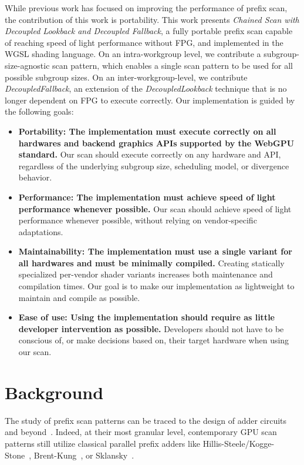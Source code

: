 \documentclass[sigconf]{acmart}
\begin{document}
While previous work has focused on improving the performance of prefix scan, the contribution of this work is portability. This work presents \emph{Chained Scan with Decoupled Lookback and Decoupled Fallback}, a fully portable prefix scan capable of reaching speed of light performance without FPG, and implemented in the WGSL shading language. On an intra-workgroup level, we contribute a subgroup-size-agnostic scan pattern, which enables a single scan pattern to be used for all possible subgroup sizes. On an inter-workgroup-level, we contribute \emph{DecoupledFallback}, an extension of the \emph{DecoupledLookback} technique that is no longer dependent on FPG to execute correctly. Our implementation is guided by the following goals:
\begin{itemize}
  \item \textbf{Portability: The implementation must execute correctly on all hardwares and backend graphics APIs supported by the WebGPU standard.} Our scan should execute correctly on any hardware and API, regardless of the underlying subgroup size, scheduling model, or divergence behavior.
  \item \textbf{Performance: The implementation must achieve speed of light performance whenever possible.} Our scan should achieve speed of light performance whenever possible, without relying on vendor-specific adaptations.
  \item \textbf{Maintainability: The implementation must use a single variant for all hardwares and must be minimally compiled.} Creating statically specialized per-vendor shader variants increases both maintenance and compilation times. Our goal is to make our implementation as lightweight to maintain and compile as possible.
  \item \textbf{Ease of use: Using the implementation should require as little developer intervention as possible.} Developers should not have to be conscious of, or make decisions based on, their target hardware when using our scan.
\end{itemize}

\section{Background}

The study of prefix scan patterns can be traced to the design of adder circuits and beyond~\cite{10.1145/322217.322232, 5219801}. Indeed, at their most granular level, contemporary GPU scan patterns still utilize classical parallel prefix adders like Hillis-Steele/Kogge-Stone~\cite{10.1145/7902.7903, 5009159}, Brent-Kung~\cite{1675982}, or Sklansky~\cite{5219822}.
\end{document}
